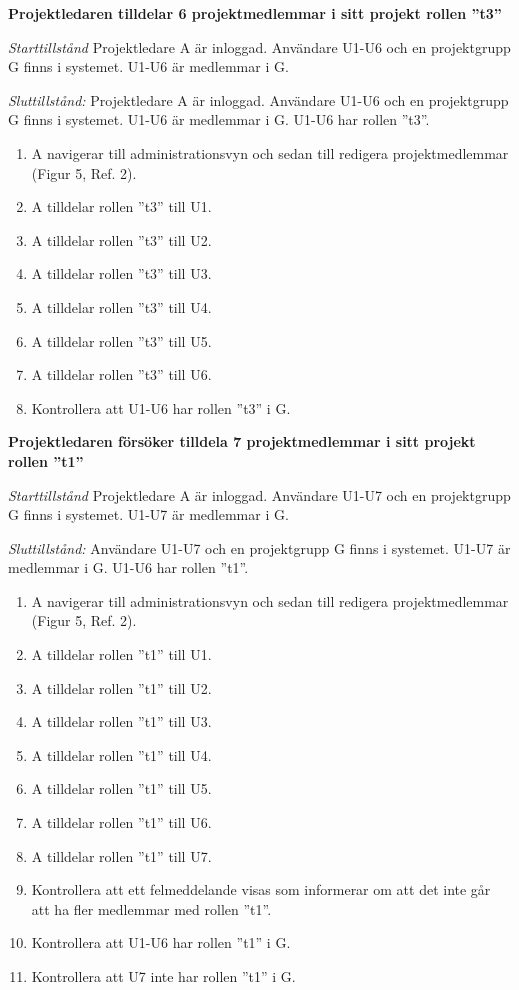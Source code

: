 \documentclass[a4paper]{article}
\begin{document}
\begin{FT}
\item
\textbf{Projektledaren tilldelar 6 projektmedlemmar i sitt projekt rollen ''t3''}

\emph{Starttillstånd} Projektledare A är inloggad. Användare U1-U6 och en projektgrupp G finns i systemet. U1-U6 är medlemmar i G.

\emph{Sluttillstånd:} Projektledare A är inloggad. Användare U1-U6 och en projektgrupp G finns i systemet. U1-U6 är medlemmar i G. U1-U6 har rollen ''t3''.

\begin{enumerate}
\item A navigerar till administrationsvyn och sedan till redigera projektmedlemmar (Figur 5, Ref. 2).
\item A tilldelar rollen ''t3'' till U1.
\item A tilldelar rollen ''t3'' till U2.
\item A tilldelar rollen ''t3'' till U3.
\item A tilldelar rollen ''t3'' till U4.
\item A tilldelar rollen ''t3'' till U5.
\item A tilldelar rollen ''t3'' till U6.
\item Kontrollera att U1-U6 har rollen ''t3'' i G.
\end{enumerate}

\item
\textbf{Projektledaren försöker tilldela 7 projektmedlemmar i sitt projekt rollen ''t1''}

\emph{Starttillstånd} Projektledare A är inloggad. Användare U1-U7 och en projektgrupp G finns i systemet. U1-U7 är medlemmar i G.

\emph{Sluttillstånd:} Användare U1-U7 och en projektgrupp G finns i systemet. U1-U7 är medlemmar i G. U1-U6 har rollen ''t1''.

\begin{enumerate}
\item A navigerar till administrationsvyn och sedan till redigera projektmedlemmar (Figur 5, Ref. 2).
\item A tilldelar rollen ''t1'' till U1.
\item A tilldelar rollen ''t1'' till U2.
\item A tilldelar rollen ''t1'' till U3.
\item A tilldelar rollen ''t1'' till U4.
\item A tilldelar rollen ''t1'' till U5.
\item A tilldelar rollen ''t1'' till U6.
\item A tilldelar rollen ''t1'' till U7.
\item Kontrollera att ett felmeddelande visas som informerar om att det inte går att ha fler medlemmar med rollen ''t1''.
\item Kontrollera att U1-U6 har rollen ''t1'' i G.
\item Kontrollera att U7 inte har rollen ''t1'' i G.
\end{enumerate}


\end{FT}
\end{document}
